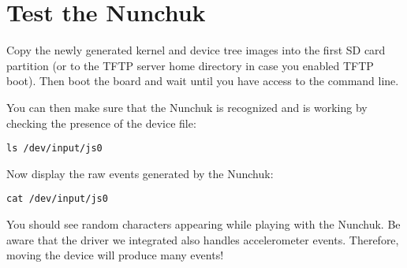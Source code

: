 
\section{Test the Nunchuk}

Copy the newly generated kernel and device tree images into the first SD card
partition (or to the TFTP server home directory in case you enabled TFTP
boot). Then boot the board and wait until you have access to the
 command line.

You can then make sure that the Nunchuk is recognized and is working by
checking the presence of the  device file:
\begin{verbatim}
ls /dev/input/js0
\end{verbatim}

Now display the raw events generated by the Nunchuk:
\begin{verbatim}
cat /dev/input/js0
\end{verbatim}

You should see random characters appearing while playing with the Nunchuk.
{Be aware that the driver we integrated also handles accelerometer events.
Therefore, moving the device will produce many events!}

